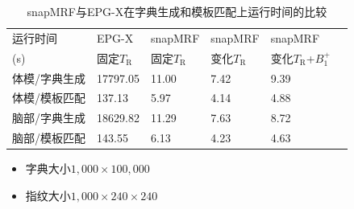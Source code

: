 \documentclass{beamer}
\begin{document}
\begin{frame}
\begin{table}
\caption{snapMRF与EPG-X在字典生成和模板匹配上运行时间的比较}
\centering
\label{tab:time}
\begin{tabular}{|l|l|l|l|l|l|}
\hline
\hline
运行时间 & EPG-X & snapMRF & snapMRF & snapMRF\\ 
(s) & 固定$T_\mathrm{R}$ & 固定$T_\mathrm{R}$ & 变化$T_\mathrm{R}$ & 变化$T_\mathrm{R}$+$B_1^+$\\
\hline
体模/字典生成 & 17797.05 & 11.00 & 7.42 & 9.39 \\
\hline
体模/模板匹配 & 137.13 & 5.97 & 4.14 & 4.88\\
\hline
脑部/字典生成 & 18629.82 & 11.29 & 7.63 & 8.72 \\
\hline
脑部/模板匹配 & 143.55 & 6.13 & 4.23 & 4.63 \\
\hline
\end{tabular}
\end{table}
\begin{itemize}
	\item 字典大小$1,000\times 100,000$
	\item 指纹大小$1,000\times 240\times 240$
\end{itemize}
\end{frame}

\begin{frame}

\end{frame}
\end{document}
